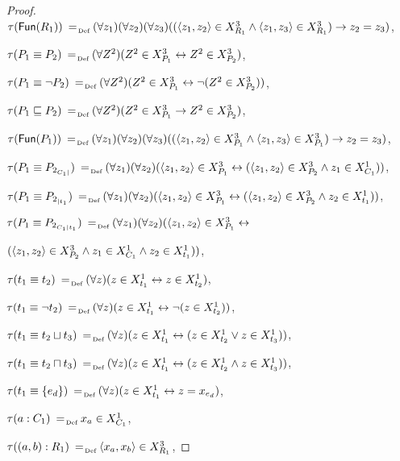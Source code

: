 \documentclass[a4paper]{llncs}
\newcommand{\defAs}{\mathrel{\makebox{\:= \hspace{-.2cm} \raisebox{-0.5 ex}[0 ex][0 ex]{\tiny Def}}}}
\newcommand{\fun}{\mathsf{Fun}}
\begin{document}
\begin{proof}
{\noindent $\tau(\fun(R_1)) \defAs (\forall z_1)(\forall z_2)(\forall z_3)((\langle z_1,z_2\rangle \in X_{R_1}^3 \wedge \langle z_1,z_3\rangle \in X_{R_1}^3) \rightarrow z_2 =z_3)$,

\noindent $\tau(P_1 \equiv P_2) \defAs (\forall Z^2)(Z^2 \in X_{P_1}^3 \leftrightarrow Z^2 \in X_{P_2}^3)$,

\noindent $\tau(P_1 \equiv \neg P_2) \defAs (\forall Z^2)(Z^2 \in X_{P_1}^3 \leftrightarrow \neg(Z^2 \in X_{P_2}^3))$,

\noindent $\tau(P_1 \sqsubseteq P_2) \defAs (\forall Z^2)(Z^2 \in X_{P_1}^3 \rightarrow Z^2 \in X_{P_2}^3)$,

\noindent $\tau(\fun(P_1)) \defAs (\forall z_1)(\forall z_2)(\forall z_3)((\langle z_1,z_2\rangle \in X_{P_1}^3 \wedge \langle z_1,z_3\rangle \in X_{P_1}^3) \rightarrow z_2 =z_3)$,

\noindent $\tau(P_1 \equiv P_{2_{C_1 |}}) \defAs (\forall z_1)(\forall z_2)(\langle z_1,z_2\rangle \in X_{P_1}^3 \leftrightarrow (\langle z_1,z_2\rangle \in X_{P_2}^3 \wedge z_1 \in X_{C_1}^1))$,

\noindent $\tau(P_1 \equiv P_{2_{|t_1}}) \defAs (\forall z_1)(\forall z_2)(\langle z_1,z_2\rangle \in X_{P_1}^3 \leftrightarrow (\langle z_1,z_2\rangle \in X_{P_2}^3 \wedge z_2 \in X_{t_1}^1))$,

\noindent $\tau(P_1 \equiv P_{2_{C_1|t_1}}) \defAs (\forall z_1)(\forall z_2)(\langle z_1,z_2\rangle \in X_{P_1}^3 \leftrightarrow$

\noindent $\hfill (\langle z_1,z_2\rangle \in X_{P_2}^3 \wedge z_1 \in X_{C_1}^1 \wedge z_2 \in X_{t_1}^1))$,

\noindent $\tau(t_1 \equiv t_2)\defAs (\forall z)(z \in X_{t_1}^1 \leftrightarrow z \in X_{t_2}^1)$,

\noindent $\tau(t_1 \equiv \neg t_2)\defAs (\forall z)(z \in X_{t_1}^1 \leftrightarrow \neg (z \in X_{t_2}^1))$,

\noindent $\tau(t_1 \equiv t_2 \sqcup t_3)\defAs (\forall z)(z \in X_{t_1}^1 \leftrightarrow (z \in X_{t_2}^1\vee z \in X_{t_3}^1))$,

\noindent $\tau(t_1 \equiv t_2 \sqcap t_3)\defAs (\forall z)(z \in X_{t_1}^1 \leftrightarrow (z \in X_{t_2}^1\wedge z \in X_{t_3}^1))$,

\noindent $\tau(t_1 \equiv \{e_{d}\})\defAs (\forall z)(z \in X_{t_1}^1 \leftrightarrow z = x_{e_{d}})$,

\noindent $\tau(a : C_1) \defAs x_a \in X_{C_1}^1$,

\noindent $\tau((a,b) : R_1) \defAs \langle x_a, x_b\rangle \in X_{R_1}^3$,

}
\end{proof}
\end{document}
